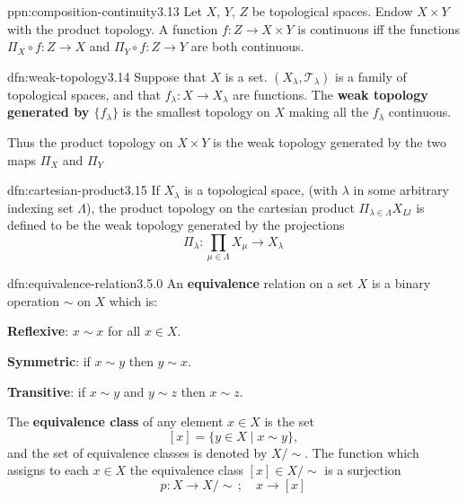 \documentclass[landscape, 8pt]{extarticle}
\begin{document}
\begin{multicols}{3}
\begin{ppn}{ppn:composition-continuity}{3.13}
	Let $X,\,Y,\,Z$ be topological spaces. Endow $X \times Y$ with the product topology. A function $f : Z \to X \times Y$ is continuous iff the functions $\Pi_{X} \circ f : Z \to X$ and $\Pi_{Y} \circ f : Z \to Y$ are both continuous.
\end{ppn}

\begin{dfn}{dfn:weak-topology}{3.14}
	Suppose that $X$ is a set. $(X_{\lambda}, \mathcal{T}_{\lambda})$ is a family of topological spaces, and that $f_{\lambda} : X \to X_{\lambda}$ are functions. The \textbf{weak topology generated by $\{f_{\lambda}\}$} is the smallest topology on $X$ making all the $f_{\lambda}$ continuous.

	Thus the product topology on $X \times Y$ is the weak topology generated by the two maps $\Pi_{X}$ and $\Pi_{Y}$
\end{dfn}

\begin{dfn}{dfn:cartesian-product}{3.15}
	If $X_{\lambda}$ is a topological space, (with $\lambda$ in some arbitrary indexing set $\Lambda$), the product topology on the cartesian product $\Pi_{\lambda\in \Lambda} X_{Ll}$ is defined to be the weak topology generated by the projections
	\[
		\Pi_{\lambda} : \prod_{\mu\in \Lambda} X_{\mu} \to X_{\lambda}
	\]
\end{dfn}

\begin{dfn}{dfn:equivalence-relation}{3.5.0}
An \textbf{equivalence} relation on a set $X$ is a binary operation $\sim$ on $X$ which is:
\begin{enumerate-tight}
\item \textbf{Reflexive}: $x \sim x$ for all $x\in X$.
\item \textbf{Symmetric}: if $x \sim y$ then $y \sim x$.
\item \textbf{Transitive}: if $x \sim y$ and $y \sim z$ then $x \sim z$.
\end{enumerate-tight}
The \textbf{equivalence class} of any element $x\in X$ is the set
\[[x] = \{y \in X \mid x \sim y\},\]
and the set of equivalence classes is denoted by $X / \sim$. The function which assigns to each $x\in X$ the equivalence class $[x] \in X / \sim$ is a surjection
\[p : X \to X / \sim \,; \quad x \to [x]\]
\end{dfn}


\end{multicols}
\end{document}
